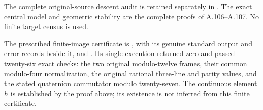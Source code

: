 The complete original-source descent audit is retained separately in
.
The exact central model and geometric stability are the complete
proofs of A.106--A.107. No finite target census is used.

The prescribed finite-image certificate is
,
with its genuine standard output and error records beside it, and
.
Its single execution returned zero and passed twenty-six exact checks:
the two original modulo-twelve frames, their common modulo-four
normalization, the original rational three-line and parity values,
and the stated quaternion commutator modulo twenty-seven.
The continuous element \(h\) is established by the proof above;
its existence is not inferred from this finite certificate.
